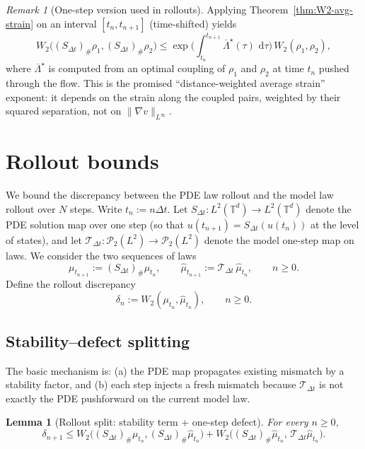 \documentclass{article}
\numberwithin{equation}{section}
\theoremstyle{plain}
\newtheorem{lemma}[theorem]{Lemma}
\theoremstyle{definition}
\theoremstyle{remark}
\newtheorem{remark}[theorem]{Remark}
\newcommand{\T}{\mathbb{T}}
\newcommand{\Pcal}{\mathcal{P}}
\newcommand{\dd}{\,\mathrm{d}}
\begin{document}
\begin{remark}[One-step version used in rollouts]\label{rem:one-step-from-avg-strain}
Applying Theorem~\ref{thm:W2-avg-strain} on an interval $[t_n,t_{n+1}]$ (time-shifted) yields
\[
W_2\big((S_{\Delta t})_\#\rho_1,(S_{\Delta t})_\#\rho_2\big)
\le
\exp\Big(\int_{t_n}^{t_{n+1}}\overline\Lambda^\star(\tau)\,\dd\tau\Big)\,W_2(\rho_1,\rho_2),
\]
where $\overline\Lambda^\star$ is computed from an optimal coupling of $\rho_1$ and $\rho_2$ at time $t_n$ pushed through the flow.
This is the promised ``distance-weighted average strain'' exponent: it depends on the strain along the coupled pairs,
weighted by their squared separation, not on $\|\nabla v\|_{L^\infty}$.
\end{remark}



\section{Rollout bounds}
\label{sec:rollout}

We bound the discrepancy between the PDE law rollout and the model law rollout over $N$ steps.
Write $t_n:=n\Delta t$.
Let $S_{\Delta t}:L^2(\T^d)\to L^2(\T^d)$ denote the PDE solution map over one step
(so that $u(t_{n+1})=S_{\Delta t}(u(t_n))$ at the level of states),
and let $\mathcal T_{\Delta t}:\Pcal_2(L^2)\to\Pcal_2(L^2)$ denote the model one-step map on laws.
We consider the two sequences of laws
\[
\mu_{t_{n+1}} := (S_{\Delta t})_\# \mu_{t_n},
\qquad
\widehat\mu_{t_{n+1}} := \mathcal T_{\Delta t}\,\widehat\mu_{t_n},
\qquad n\ge 0.
\]
Define the rollout discrepancy
\[
\delta_n := W_2(\mu_{t_n},\widehat\mu_{t_n}),\qquad n\ge 0.
\]

\subsection{Stability--defect splitting}

The basic mechanism is: (a) the PDE map propagates existing mismatch by a stability factor,
and (b) each step injects a fresh mismatch because $\mathcal T_{\Delta t}$ is not exactly
the PDE pushforward on the current model law.

\begin{lemma}[Rollout split: stability term + one-step defect]
\label{lem:rollout-split}
For every $n\ge 0$,
\[
\delta_{n+1}
\le
W_2\big((S_{\Delta t})_\#\mu_{t_n},(S_{\Delta t})_\#\widehat\mu_{t_n}\big)
+
W_2\big((S_{\Delta t})_\#\widehat\mu_{t_n},\,\mathcal T_{\Delta t}\widehat\mu_{t_n}\big).
\]
\end{lemma}
\end{document}
